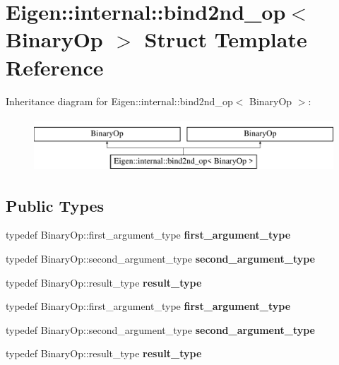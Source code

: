 \hypertarget{struct_eigen_1_1internal_1_1bind2nd__op}{}\section{Eigen\+:\+:internal\+:\+:bind2nd\+\_\+op$<$ Binary\+Op $>$ Struct Template Reference}
\label{struct_eigen_1_1internal_1_1bind2nd__op}
Inheritance diagram for Eigen\+:\+:internal\+:\+:bind2nd\+\_\+op$<$ Binary\+Op $>$\+:\begin{figure}[H]
\begin{center}
\leavevmode
\includegraphics[height=2.000000cm]{struct_eigen_1_1internal_1_1bind2nd__op}
\end{center}
\end{figure}
\subsection*{Public Types}
\begin{DoxyCompactItemize}
\item 
\mbox{\label{struct_eigen_1_1internal_1_1bind2nd__op_a4adfa0f8948a383979d3c5aa83d0dd94}} 
typedef Binary\+Op\+::first\+\_\+argument\+\_\+type {\bfseries first\+\_\+argument\+\_\+type}
\item 
\mbox{\label{struct_eigen_1_1internal_1_1bind2nd__op_a70aef800d3ea7ae665c4d671c49a3b73}} 
typedef Binary\+Op\+::second\+\_\+argument\+\_\+type {\bfseries second\+\_\+argument\+\_\+type}
\item 
\mbox{\label{struct_eigen_1_1internal_1_1bind2nd__op_ad97adf3801d80deece8c22de5033a3d5}} 
typedef Binary\+Op\+::result\+\_\+type {\bfseries result\+\_\+type}
\item 
\mbox{\label{struct_eigen_1_1internal_1_1bind2nd__op_a4adfa0f8948a383979d3c5aa83d0dd94}} 
typedef Binary\+Op\+::first\+\_\+argument\+\_\+type {\bfseries first\+\_\+argument\+\_\+type}
\item 
\mbox{\label{struct_eigen_1_1internal_1_1bind2nd__op_a70aef800d3ea7ae665c4d671c49a3b73}} 
typedef Binary\+Op\+::second\+\_\+argument\+\_\+type {\bfseries second\+\_\+argument\+\_\+type}
\item 
\mbox{\label{struct_eigen_1_1internal_1_1bind2nd__op_ad97adf3801d80deece8c22de5033a3d5}} 
typedef Binary\+Op\+::result\+\_\+type {\bfseries result\+\_\+type}
\end{DoxyCompactItemize}
